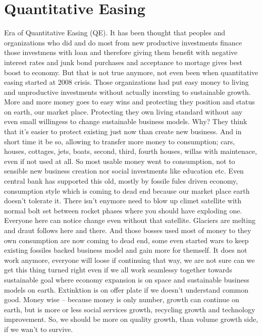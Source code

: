 \section{Quantitative Easing}
Era of Quantitative Easing (QE). It has been thought that peoples and organizations who did and do most from new productive investments finance those investmens with loan and therefore giving them benefit with negative interest rates and junk bond purchases and acceptance to mortage gives best boost to economy. But that is not true anymore, not even been when quantitative easing started at 2008 crisis. Those organizations had put easy money to living and unproductive investments without actually incesting to sustainable growth. More and more money goes to easy wins and protecting they position and status on earth, our market place. Protecting they own living standard without any even small willingess to change sustainable business models. Why? They think that it's easier to protect existing just now than create new business. And in short time it be so, allowing to transfer more money to consumption; cars, houses, cottages, jets, boats, second, third, fourth houses, willas with maintenace, even if not used at all. So most usable money went to consumption, not to sensible new business creation nor social investments like education etc. Even central bank has supported this old, mostly by fossile fules driven economy, consumption style which is coming to dead end because our market place earth doesn't tolerate it. There isn't enymore need to blow up climet satellite with normal bolt set between rocket phases where you should have exploding one. Everyone here can notice change even without that satellite. Glaciers are melting and draut follows here and there. And those bosses used most of money to they own consumption are now coming to dead end, some even started wars to keep existing fossiles backed business model and gain more for themself. It does not work anymore, everyone will loose if continuing that way, we are not sure can we get this thing turned right even if we all work seamlessy together towards sustainable goal where economy expansion is on space and sustainable business models on earth. Extinktion is on offer plate if we doesn't understand common good. Money wise -- because money is only number, growth can continue on earth, but is more or less social services growth, recycling growth and technology improvement. So, we should be more on quality growth, than volume growth side, if we wan't to survive.

